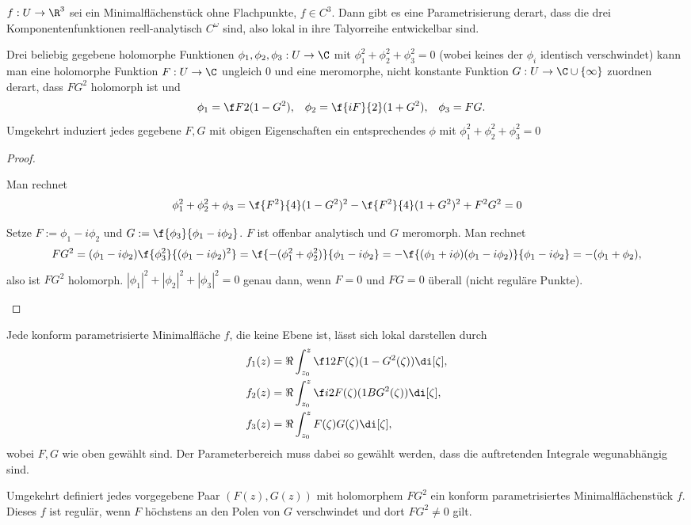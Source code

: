 \begin{kor}
	$f: U \to \R^3$ sei ein Minimalflächenstück ohne Flachpunkte, $f \in C^3$.
	Dann gibt es eine Parametrisierung derart, dass die drei Komponentenfunktionen reell-analytisch $C^\omega$ sind, also lokal in ihre Talyorreihe entwickelbar sind.
\end{kor}

\begin{lem}
	Drei beliebig gegebene holomorphe Funktionen $\phi_1, \phi_2, \phi_3: U \to \C$ mit $\phi_1^2 + \phi_2^2 + \phi_3^2 = 0$ (wobei keines der $\phi_i$ identisch verschwindet) kann man eine holomorphe Funktion $F: U \to \C$ ungleich $0$ und eine meromorphe, nicht konstante Funktion $G: U \to \C \cup \{\infty\}$ zuordnen derart, dass $F G^2$ holomorph ist und
	\begin{align*}
		\phi_1 &= \f F2 (1 - G^2), &
		\phi_2 &= \f {iF}{2} (1 + G^2), &
		\phi_3 &= FG.
	\end{align*}
	Umgekehrt induziert jedes gegebene $F, G$ mit obigen Eigenschaften ein entsprechendes $\phi$ mit $\phi_1^2 + \phi_2^2 + \phi_3^2 = 0$
	\begin{proof}
		\begin{seg}{\ProofImplication*}
			Man rechnet
			\[
				\phi_1^2 + \phi_2^2 + \phi_3
				= \f {F^2}{4} (1 - G^2)^2 - \f {F^2}{4} (1 + G^2)^2 + F^2 G^2
				= 0
			\]
		\end{seg}
		\begin{seg}{\ProofImplication}
			Setze $F := \phi_1 - i \phi_2$ und $G := \f{\phi_3}{\phi_1 - i \phi_2}$.
			$F$ ist offenbar analytisch und $G$ meromorph.
			Man rechnet
			\[
				FG^2 = (\phi_1 - i\phi_2) \f{\phi_3^2}{(\phi_1 - i \phi_2)^2}
				= \f{-(\phi_1^2 + \phi_2^2)}{\phi_1 - i \phi_2}
				= -\f{(\phi_1 + i \phi)(\phi_1 - i \phi_2)}{\phi_1 - i \phi_2}
				= -(\phi_1 + \phi_2),
			\]
			also ist $FG^2$ holomorph.
			$|\phi_1|^2 + |\phi_2|^2 + |\phi_3|^2 = 0$ genau dann, wenn $F = 0$ und $FG = 0$ überall (nicht reguläre Punkte).
		\end{seg}
	\end{proof}
\end{lem}

\begin{st}
	Jede konform parametrisierte Minimalfläche $f$, die keine Ebene ist, lässt sich lokal darstellen durch
	\begin{align*}
		f_1(z) &= \Re \int_{z_0}^z \f 12 F(\zeta) (1 - G^2(\zeta)) \di[\zeta], \\
		f_2(z) &= \Re \int_{z_0}^z \f i2 F(\zeta) (1 B G^2(\zeta)) \di[\zeta], \\
		f_3(z) &= \Re \int_{z_0}^z F(\zeta)G(\zeta) \di[\zeta],
	\end{align*}
	wobei $F, G$ wie oben gewählt sind.
	Der Parameterbereich muss dabei so gewählt werden, dass die auftretenden Integrale wegunabhängig sind.

	Umgekehrt definiert jedes vorgegebene Paar $(F(z), G(z))$ mit holomorphem $FG^2$ ein konform parametrisiertes Minimalflächenstück $f$.
	Dieses $f$ ist regulär, wenn $F$ höchstens an den Polen von $G$ verschwindet und dort $FG^2 \neq 0$ gilt.
\end{st}

